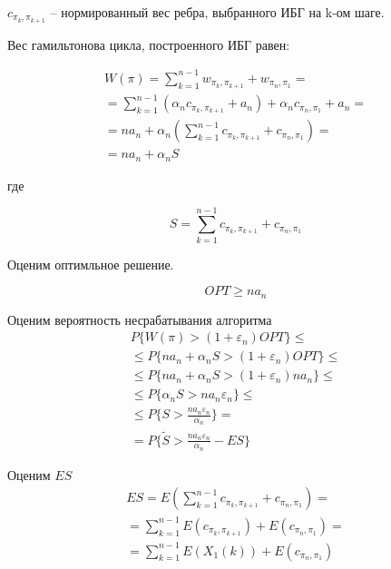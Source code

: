 \documentclass[a4paper, 14pt]{extarticle}
\numberwithin{equation}{section}
\begin{document}
$c_{\pi_k, \pi_{k+1}}$ -- нормированный вес ребра, выбранного ИБГ на k-ом шаге.

Вес гамильтонова цикла, построенного ИБГ равен:

\begin{equation}
\begin{aligned}
W(\pi) = \sum_{k=1}^{n-1} w_{\pi_k, \pi_{k+1}} + w_{\pi_n, \pi_{1}} = \\
= \sum_{k=1}^{n-1} (\alpha_n c_{\pi_k, \pi_{k+1}} + a_n) +\alpha_n c_{\pi_n, \pi_{1}} + a_n = \\
= na_n + \alpha_n( \sum_{k=1}^{n-1} c_{\pi_k, \pi_{k+1}} + c_{\pi_n, \pi_1}) = \\
= na_n + \alpha_n S
\end{aligned}
\end{equation}

где

\begin{equation}
S = \sum_{k=1}^{n-1} c_{\pi_k, \pi_{k+1}} + c_{\pi_n, \pi_1}
\end{equation}

Оценим оптимльное решение.

\begin{equation}
OPT \geqslant na_n
\end{equation}

Оценим вероятность несрабатывания алгоритма
\begin{equation}
\begin{aligned}
P\{ W(\pi)>(1+\varepsilon_n)OPT \} \leqslant \\
\leqslant P\{na_n + \alpha_n S > (1+\varepsilon_n)OPT \} \leqslant \\ 
\leqslant P\{na_n + \alpha_n S > (1+\varepsilon_n)na_n \} \leqslant \\
\leqslant P\{\alpha_n S > na_n\varepsilon_n \} \leqslant \\
\leqslant P\{S >\frac{na_n\varepsilon_n}{\alpha_n}  \} = \\
= P\{\tilde{S} >\frac{na_n\varepsilon_n}{\alpha_n} - ES  \}
\end{aligned}
\end{equation}

Оценим $ES$
\begin{equation}
\begin{aligned}
ES = E( \sum_{k=1}^{n-1} c_{\pi_k, \pi_{k+1}} + c_{\pi_n, \pi_1} ) =\\
=  \sum_{k=1}^{n-1} E(c_{\pi_k, \pi_{k+1}}) + E(c_{\pi_n, \pi_1}) = \\
= \sum_{k=1}^{n-1} E(X_1(k)) + E(c_{\pi_n, \pi_1})
\end{aligned}
\end{equation}
\end{document}
